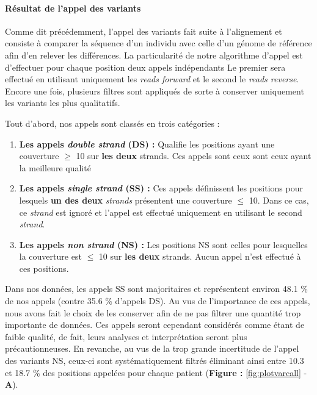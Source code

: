 \documentclass[12pt,twoside]{reedthesis}
\providecommand{\tightlist}{%
  \setlength{\itemsep}{0pt}\setlength{\parskip}{0pt}}
\theoremstyle{definition}
\theoremstyle{definition}
\theoremstyle{remark}
\begin{document}
  \newpage
  
  \paragraph{Résultat de l'appel des
  variants}\label{resultat-de-lappel-des-variants}
  
  Comme dit précédemment, l'appel des variants fait suite à l'alignement
  et consiste à comparer la séquence d'un individu avec celle d'un génome
  de référence afin d'en relever les différences. La particularité de
  notre algorithme d'appel est d'effectuer pour chaque position deux
  appels indépendants Le premier sera effectué en utilisant uniquement les
  \emph{reads forward} et le second le \emph{reads reverse}. Encore une
  fois, plusieurs filtres sont appliqués de sorte à conserver uniquement
  les variants les plus qualitatifs.
  
  Tout d'abord, nos appels sont classés en trois catégories :
  
  \begin{enumerate}
  \def\labelenumi{\arabic{enumi}.}
  \tightlist
  \item
    \textbf{Les appels \emph{double strand} (DS) :} Qualifie les positions
    ayant une couverture \(\ge\) 10 sur \textbf{les deux} strands. Ces
    appels sont ceux sont ceux ayant la meilleure qualité
  \item
    \textbf{Les appels \emph{single strand} (SS) :} Ces appels définissent
    les positions pour lesquels \textbf{un des deux} \emph{strands}
    présentent une couverture \(\le\) 10. Dans ce cas, ce \emph{strand}
    est ignoré et l'appel est effectué uniquement en utilisant le second
    \emph{strand}.\\
  \item
    \textbf{Les appels \emph{non strand} (NS) :} Les positions NS sont
    celles pour lesquelles la couverture est \(\le\) 10 sur \textbf{les
    deux} strands. Aucun appel n'est effectué à ces positions.
  \end{enumerate}
  
  Dans nos données, les appels SS sont majoritaires et représentent
  environ 48.1 \% de nos appels (contre 35.6 \% d'appels DS). Au vus de
  l'importance de ces appels, nous avons fait le choix de les conserver
  afin de ne pas filtrer une quantité trop importante de données. Ces
  appels seront cependant considérés comme étant de faible qualité, de
  fait, leurs analyses et interprétation seront plus précautionneuses. En
  revanche, au vus de la trop grande incertitude de l'appel des variants
  NS, ceux-ci sont systématiquement filtrés éliminant ainsi entre 10.3 et
  18.7 \% des positions appelées pour chaque patient (\textbf{Figure :
  }\ref{fig:plotvarcall} - \textbf{A}).
  
\end{document}
